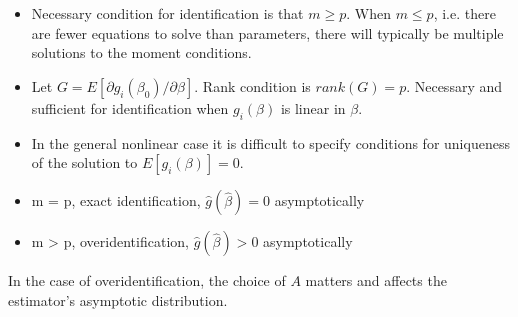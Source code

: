 \begin{frame}

\begin{itemize}
\item Necessary condition for identification is that $m \geq p$. When $m \leq p$, i.e. there are fewer equations to solve than parameters, there will
typically be multiple solutions to the moment conditions.
\end{itemize}

\end{frame}
\begin{frame}

\begin{itemize}\setlength\itemsep{1em}
\item Let $G = E[\partial g_i(\beta_0) / \partial \beta]$. Rank condition is $rank(G) = p$. Necessary and sufficient for identification when $g_i(\beta)$ is linear in $\beta$.
\item In the general nonlinear case it is difficult to specify conditions for uniqueness of the solution to $E[g_i(\beta)] = 0$.
\end{itemize}

\end{frame}
\begin{frame}

\begin{itemize}\setlength\itemsep{1em}
\item m = p, exact identification, $\hat{g}(\hat{\beta}) = 0$ asymptotically
\item m > p, overidentification, $\hat{g}(\hat{\beta}) > 0$ asymptotically\vspace{0.3cm}
\end{itemize}

In the case of overidentification, the choice of $A$ matters and affects the estimator's asymptotic distribution.

\end{frame}
